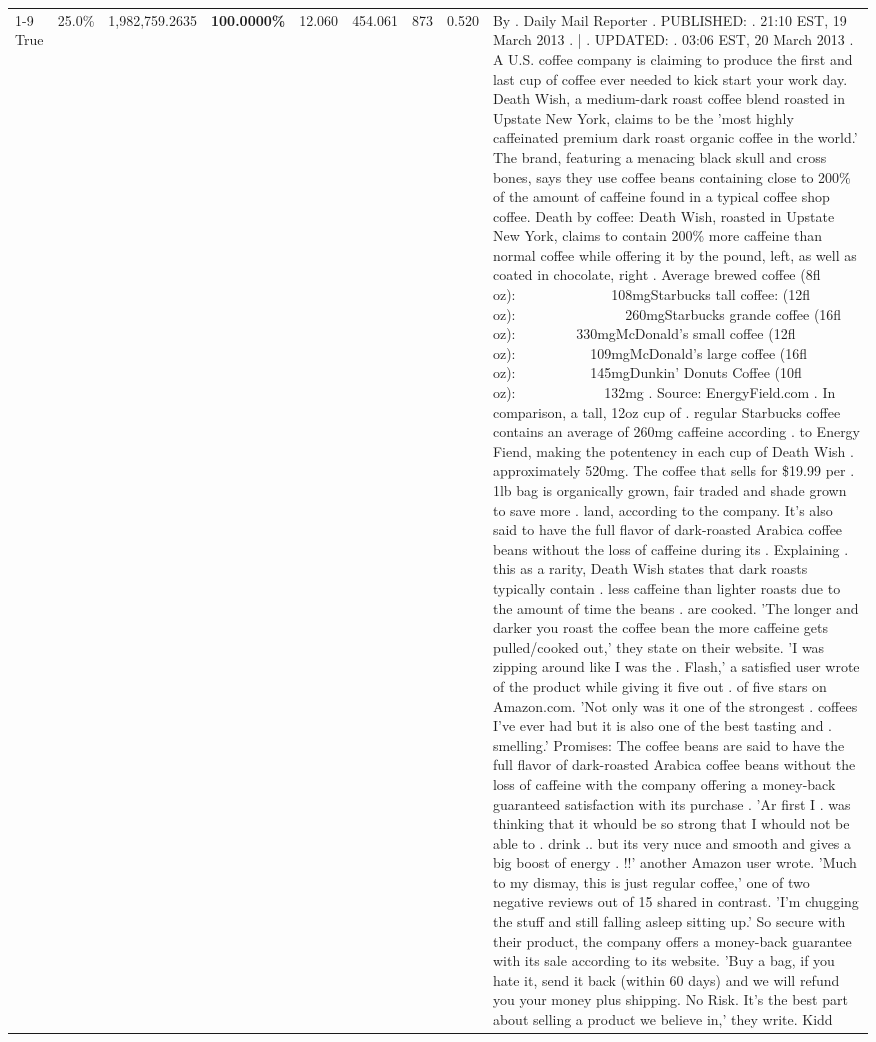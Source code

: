 \begin{table}[H]
{\begin{tabular}{lllrlllll}
\cline{1-9}
True & 25.0\% & 1,982,759.2635 & \bfseries \color{red} 100.0000\% & 12.060 & 454.061 & 873 & 0.520 & By . Daily Mail Reporter . PUBLISHED: . 21:10 EST, 19 March 2013 . | . UPDATED: . 03:06 EST, 20 March 2013 . A U.S. coffee company is claiming to produce the first and last cup of coffee ever needed to kick start your work day. Death Wish, a medium-dark roast coffee blend roasted in Upstate New York, claims to be the 'most highly caffeinated premium dark roast organic coffee in the world.' The brand, featuring a menacing black skull and cross bones, says they use coffee beans containing close to 200\% of the amount of caffeine found in a typical coffee shop coffee. Death by coffee: Death Wish, roasted in Upstate New York, claims to contain 200\% more caffeine than normal coffee while offering it by the pound, left, as well as coated in chocolate, right . Average brewed coffee (8fl oz):              108mgStarbucks tall coffee: (12fl oz):                260mgStarbucks grande coffee (16fl oz):         330mgMcDonald's small coffee (12fl oz):           109mgMcDonald's large coffee (16fl oz):           145mgDunkin' Donuts Coffee (10fl oz):             132mg . Source: EnergyField.com . In comparison, a tall, 12oz cup of . regular Starbucks coffee contains an average of 260mg caffeine according . to Energy Fiend, making the potentency in each cup of Death Wish . approximately 520mg. The coffee that sells for \$19.99 per . 1lb bag is organically grown, fair traded and shade grown to save more . land, according to the company. It's also said to have the full flavor of dark-roasted Arabica coffee beans without the loss of caffeine during its . Explaining . this as a rarity, Death Wish states that dark roasts typically contain . less caffeine than lighter roasts due to the amount of time the beans . are cooked. 'The longer and darker you roast the coffee bean the more caffeine gets pulled/cooked out,' they state on their website. 'I was zipping around like I was the . Flash,' a satisfied user wrote of the product while giving it five out . of five stars on Amazon.com. 'Not only was it one of the strongest . coffees I've ever had but it is also one of the best tasting and . smelling.’ Promises: The coffee beans are said to have the full flavor of dark-roasted Arabica coffee beans without the loss of caffeine with the company offering a money-back guaranteed satisfaction with its purchase . 'Ar first I . was thinking that it whould be so strong that I whould not be able to . drink .. but its very nuce and smooth and gives a big boost of energy . !!' another Amazon user wrote. 'Much to my dismay, this is just regular coffee,' one of two negative reviews out of 15 shared in contrast. 'I'm chugging the stuff and still falling asleep sitting up.' So secure with their product, the company offers a money-back guarantee with its sale according to its website. 'Buy a bag, if you hate it, send it back (within 60 days) and we will refund you your money plus shipping. No Risk. It’s the best part about selling a product we believe in,' they write. Kidd \\

\end{tabular}}
\end{table}
